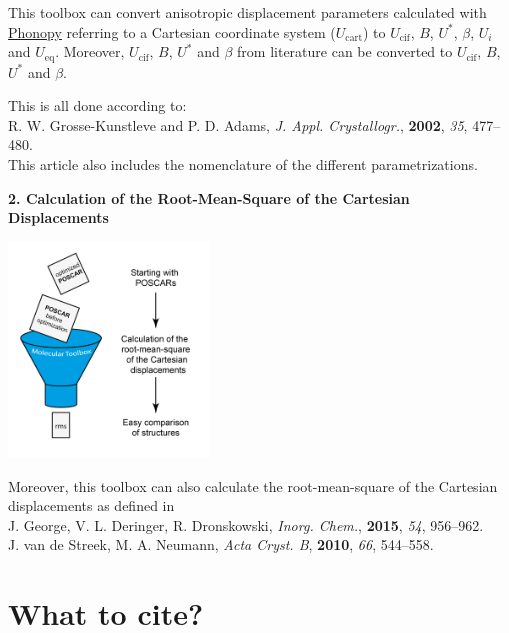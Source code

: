\documentclass[12pt,a4paper]{article}
\begin{document}
This toolbox can convert anisotropic displacement parameters calculated with \href{https://github.com/atztogo/phonopy}{Phonopy} referring to a Cartesian coordinate system ($U_{\mathrm{cart}}$) to $U_{\mathrm{cif}}$, $B$, $U^\mathrm{*}$, $\beta$, $U_{i}$ and $U_{\mathrm{eq}}$. Moreover, $U_{\mathrm{cif}}$, $B$, $U^\mathrm{*}$ and $\beta$ from literature can be converted to $U_{\mathrm{cif}}$, $B$, $U^\mathrm{*}$ and $\beta$. 

This is all done according to:\\ R. W. Grosse-Kunstleve and P. D. Adams, \textit{J. Appl. Crystallogr.}, \textbf{2002}, \textit{35}, 477–480.\\ This article also includes the nomenclature of the different parametrizations.

\textbf{2. Calculation of the Root-Mean-Square of the Cartesian Displacements}\\

\begin{center}\includegraphics[width=0.4\textwidth]{Piktogramm-02.png}\end{center}
Moreover, this toolbox can also calculate the root-mean-square of the Cartesian displacements as defined in\\ J. George, V. L. Deringer, R. Dronskowski, \textit{Inorg. Chem.}, \textbf{2015}, \textit{54}, 956–962.\\   J. van de Streek, M. A. Neumann,  \textit{Acta Cryst. B}, \textbf{2010}, \textit{66},  544–558.



\newpage
\section{What to cite?}
\end{document}
